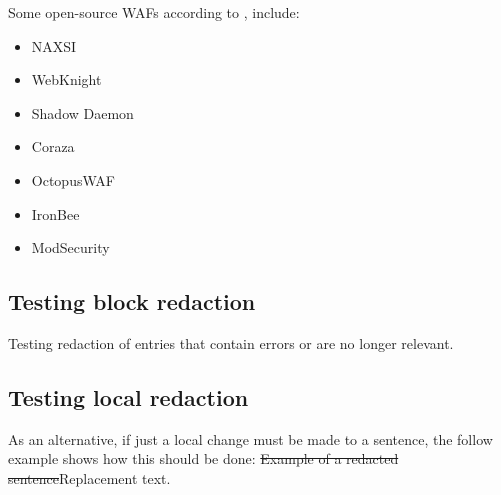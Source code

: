 Some open-source WAFs according to \cite{OSWAFS}, include:
\begin{itemize}
    \item NAXSI
    \item WebKnight
    \item Shadow Daemon
    \item Coraza
    \item OctopusWAF
    \item IronBee
    \item ModSecurity
\end{itemize}

\pendsign

\begin{mdframed}[style=redact,
    frametitle={\textcolor{white}{Redacted,
        see page~\pageref{sec:02_april} for correct version.}}]

\subsection{Testing block redaction}

Testing redaction of entries that contain errors or are no longer relevant.

\end{mdframed}

\subsection{Testing local redaction}

As an alternative, if just a local change must be made to a sentence, the
follow example shows how this should be done: \st{Example of a redacted
sentence}\textcolor{ScarletRed}{Replacement text}.

\pendsign
